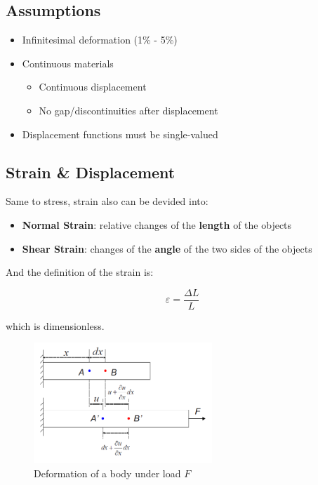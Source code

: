 \documentclass[en,hazy,cyan,8pt,normal]{elegantnote}
\numberwithin{equation}{section}
\begin{document}
  \subsection{Assumptions}
    \begin{itemize}
      \item Infinitesimal deformation (1\% - 5\%)
      \item Continuous materials
      \begin{itemize}
        \item Continuous displacement
        \item No gap/discontinuities after displacement
      \end{itemize}
      \item Displacement functions must be single-valued
    \end{itemize}

  \subsection{Strain \& Displacement}
    Same to stress, strain also can be devided into:

    \begin{itemize}
      \item \textbf{Normal Strain}: relative changes of the \textbf{length} of the objects
      \item \textbf{Shear Strain}: changes of the \textbf{angle} of the two sides of the objects
    \end{itemize}

    And the definition of the strain is:

    \begin{equation}\label{eq:033}
      \varepsilon=\frac{\Delta L}{L}
    \end{equation}

    which is dimensionless.

    \begin{figure}[H]
      \centering
      \includegraphics[width=0.6\textwidth]{image/010.png}
      \caption{Deformation of a body under load $F$}
      \label{fig:010}
    \end{figure}
\end{document}
